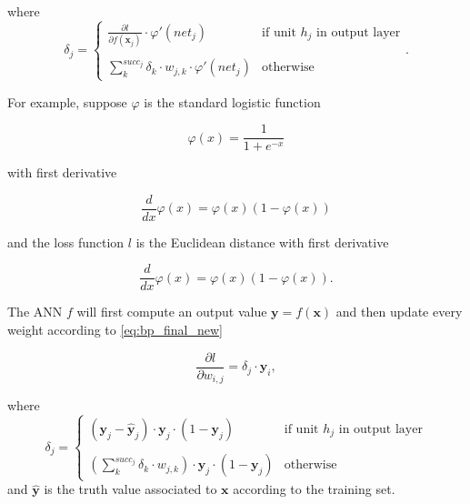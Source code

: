 where
\[
\delta_j =
\begin{cases}
     \frac{\partial l}{\partial f(\bm{x}_j)} \cdot \varphi\prime(net_j) & \text{if unit $h_j$ in output layer} \\ \\
     \sum\limits_{k}^{succ_j} \delta_k \cdot w_{j,k} \cdot \varphi\prime(net_j) & \text{otherwise}
\end{cases}.
\]

For example, suppose $\varphi$ is the standard logistic function

\[
\varphi(x) = \frac{1}{1 + e^{-x}} 
\]

with first derivative

\[
\frac{d}{dx}\varphi(x) = \varphi(x)(1 - \varphi(x))
\]

and the loss function $l$ is the Euclidean distance with first derivative

\[
\frac{d}{dx}\varphi(x) = \varphi(x)(1 - \varphi(x)).
\]

The ANN $f$ will first compute an output value $\bm{y} = f(\bm{x})$ and then update every weight according to \eqref{eq:bp_final_new} 

\[
\frac{\partial l}{\partial w_{i,j}} = \delta_j \cdot \bm{y}_i,
\]

where
\[
\delta_j =
\begin{cases}
     (\bm{y}_j - \hat{\bm{y}}_j) \cdot \bm{y}_j \cdot (1 - \bm{y}_j) & \text{if unit $h_j$ in output layer} \\ \\
     (\sum\limits_{k}^{succ_j} \delta_k \cdot w_{j,k}) \cdot \bm{y}_j \cdot (1 - \bm{y}_j) & \text{otherwise}
\end{cases}
\]
and $\hat{\bm{y}}$ is the truth value associated to $\bm{x}$ according to the training set.
